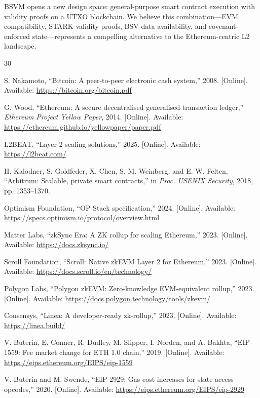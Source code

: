 \documentclass[11pt,twocolumn]{article}
\begin{document}
BSVM opens a new design space: general-purpose smart contract execution with validity proofs on a UTXO blockchain. We believe this combination---EVM compatibility, STARK validity proofs, BSV data availability, and covenant-enforced state---represents a compelling alternative to the Ethereum-centric L2 landscape.


\begin{thebibliography}{30}

S. Nakamoto, ``Bitcoin: A peer-to-peer electronic cash system,'' 2008. [Online]. Available: \url{https://bitcoin.org/bitcoin.pdf}

G. Wood, ``Ethereum: A secure decentralised generalised transaction ledger,'' \textit{Ethereum Project Yellow Paper}, 2014. [Online]. Available: \url{https://ethereum.github.io/yellowpaper/paper.pdf}

L2BEAT, ``Layer 2 scaling solutions,'' 2025. [Online]. Available: \url{https://l2beat.com/}

H. Kalodner, S. Goldfeder, X. Chen, S. M. Weinberg, and E. W. Felten, ``Arbitrum: Scalable, private smart contracts,'' in \textit{Proc. USENIX Security}, 2018, pp. 1353--1370.

Optimism Foundation, ``OP Stack specification,'' 2024. [Online]. Available: \url{https://specs.optimism.io/protocol/overview.html}

Matter Labs, ``zkSync Era: A ZK rollup for scaling Ethereum,'' 2023. [Online]. Available: \url{https://docs.zksync.io/}

Scroll Foundation, ``Scroll: Native zkEVM Layer 2 for Ethereum,'' 2023. [Online]. Available: \url{https://docs.scroll.io/en/technology/}

Polygon Labs, ``Polygon zkEVM: Zero-knowledge EVM-equivalent rollup,'' 2023. [Online]. Available: \url{https://docs.polygon.technology/tools/zkevm/}

Consensys, ``Linea: A developer-ready zk-rollup,'' 2023. [Online]. Available: \url{https://linea.build/}

V. Buterin, E. Conner, R. Dudley, M. Slipper, I. Norden, and A. Bakhta, ``EIP-1559: Fee market change for ETH 1.0 chain,'' 2019. [Online]. Available: \url{https://eips.ethereum.org/EIPS/eip-1559}

V. Buterin and M. Swende, ``EIP-2929: Gas cost increases for state access opcodes,'' 2020. [Online]. Available: \url{https://eips.ethereum.org/EIPS/eip-2929}


\end{thebibliography}
\end{document}
